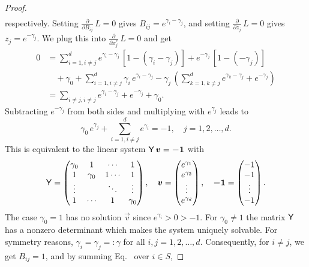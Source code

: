 \documentclass[smallextended]{svjour3}
\makeatletter
\renewcommand*{\eqref}[1]{%
  \hyperref[{#1}]{\textup{\tagform@{\ref*{#1}}}}%
}
\newcommand{\suml}{\sum\limits}
\newcommand{\pderiv}[1]{\frac{\partial}{\partial #1}}
\makeatother
\begin{document}
\begin{proof}
\begin{align*}
		\end{align*}
		respectively.
		Setting $\pderiv{B_{ij}}\,L=0$ gives $B_{ij} = e^{\gamma_i-\gamma_j}$, and setting $\pderiv{z_j}\,L = 0$ gives $z_j = e^{-\gamma_j}$.
		We plug this into $\pderiv{x_j^\ast}\,L=0$ and get
		\begin{align*}
			0 &= \suml_{i=1,i\neq j}^d e^{\gamma_i-\gamma_j}\,[1-(\gamma_i-\gamma_j)] + e^{-\gamma_j}\,[1-(-\gamma_j)]\\
			&\quad + \gamma_0 + \suml_{i=1,i\neq j}^d \gamma_i\,e^{\gamma_i-\gamma_j} - \gamma_j\,\left(\suml_{k=1,k\neq j}^d e^{\gamma_k-\gamma_j}+e^{-\gamma_j}\right)\\
			&= \suml_{i\neq j,i\neq j} e^{\gamma_i-\gamma_j}+e^{-\gamma_j} + \gamma_0.
		\end{align*}
		Subtracting $e^{-\gamma_j}$ from both sides and multiplying with $e^{\gamma_j}$ leads to
		\begin{equation*}
			\gamma_0\,e^{\gamma_j}+\suml_{i=1,i\neq j}^d e^{\gamma_i} = -1,\quad j=1,2,\ldots,d.
		\end{equation*}
		This is equivalent to the linear system $\tens{Y}\,\vec{v} = \vec{-1}$ with
		\begin{equation*}
			\tens{Y} = \begin{pmatrix}
									\gamma_0 & 1 & \cdots & 1\\
									1 & \gamma_0 & 1 \cdots & 1 \\
									\vdots & & \ddots & \vdots\\
									1 & \cdots & 1 & \gamma_0
								\end{pmatrix},\quad
			\vec{v} = \begin{pmatrix} e^{\gamma_1}\\ e^{\gamma_2}\\ \vdots \\ e^{\gamma_d} \end{pmatrix},\quad
			\vec{-1} = \begin{pmatrix} -1 \\ -1 \\ \vdots \\ -1 \end{pmatrix}.
		\end{equation*}
		The case $\gamma_0=1$ has no solution $\vec{v}$ since $e^{\gamma_i}>0>-1$.
		For $\gamma_0\neq 1$ the matrix $\mathsf{Y}$ has a nonzero determinant which makes the system uniquely solvable.
		For symmetry reasons, $\gamma_i=\gamma_j=:\gamma$ for all $i,j=1,2,\ldots,d$.
		Consequently, for $i\neq j$, we get $B_{ij}=1$, and by summing Eq.~\eqref{eqn:constraint_C2} over $i\in S$,

\end{proof}
\end{document}
